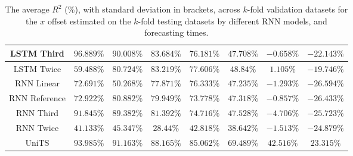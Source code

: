 \begin{table}[!ht]
{\begin{tabular}{|c|c|c|c|c|c|c|c|}
			LSTM Third & $\mathbf{96.889\%}$ & $90.008\%$ & $83.684\%$ & $76.181\%$ & $47.708\%$ & $-0.658\%$ & $-22.143\%$ \\ \hline
			LSTM Twice & $59.488\%$ & $80.724\%$ & $83.219\%$ & $77.606\%$ & $48.84\%$ & $1.105\%$ & $-19.746\%$ \\ \hline
			RNN Linear & $72.691\%$ & $50.268\%$ & $77.871\%$ & $76.333\%$ & $47.235\%$ & $-1.293\%$ & $-26.594\%$ \\ \hline
			RNN Reference & $72.922\%$ & $80.882\%$ & $79.949\%$ & $73.778\%$ & $47.318\%$ & $-0.857\%$ & $-26.433\%$ \\ \hline
			RNN Third & $91.845\%$ & $89.382\%$ & $81.392\%$ & $74.716\%$ & $47.528\%$ & $-4.706\%$ & $-25.723\%$ \\ \hline
			RNN Twice & $41.133\%$ & $45.347\%$ & $28.44\%$ & $42.818\%$ & $38.642\%$ & $-1.513\%$ & $-24.879\%$ \\ \hline
			UniTS & $93.985\%$ & $91.163\%$ & $\mathbf{88.165\%}$ & $\mathbf{85.062\%}$ & $\mathbf{69.489\%}$ & $\mathbf{42.516\%}$ & $\mathbf{23.315\%}$ \\ \hline
		\end{tabular}
	}
	\caption{The average $R^{2}$ (\%), with standard deviation in brackets, across $k$-fold validation datasets for the $x$ offset estimated on the $k$-fold testing datasets by different RNN models, and forecasting times.}
	\label{tab:all_longitude_no_abs_R2}
\end{table}

